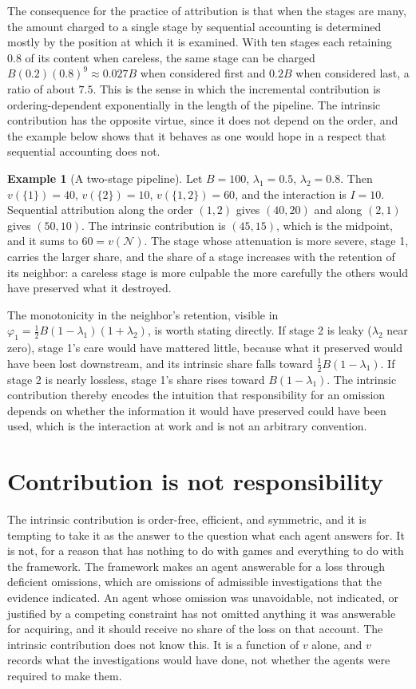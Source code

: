 \documentclass[11pt]{article}
\newcommand{\N}{\mathcal N}
\theoremstyle{plain}
\theoremstyle{definition}
\newtheorem{example}{Example}
\begin{document}
The consequence for the practice of attribution is that when the stages are many, the amount charged to a single stage by sequential accounting is determined mostly by the position at which it is examined. With ten stages each retaining $0.8$ of its content when careless, the same stage can be charged $B(0.2)(0.8)^9\approx0.027B$ when considered first and $0.2B$ when considered last, a ratio of about $7.5$. This is the sense in which the incremental contribution is ordering-dependent exponentially in the length of the pipeline. The intrinsic contribution has the opposite virtue, since it does not depend on the order, and the example below shows that it behaves as one would hope in a respect that sequential accounting does not.

\begin{example}[A two-stage pipeline]\label{ex:two}
Let $B=100$, $\lambda_1=0.5$, $\lambda_2=0.8$. Then $v(\{1\})=40$, $v(\{2\})=10$, $v(\{1,2\})=60$, and the interaction is $I=10$. Sequential attribution along the order $(1,2)$ gives $(40,20)$ and along $(2,1)$ gives $(50,10)$. The intrinsic contribution is $(45,15)$, which is the midpoint, and it sums to $60=v(\N)$. The stage whose attenuation is more severe, stage 1, carries the larger share, and the share of a stage increases with the retention of its neighbor: a careless stage is more culpable the more carefully the others would have preserved what it destroyed.
\end{example}

The monotonicity in the neighbor's retention, visible in $\varphi_1=\tfrac12B(1-\lambda_1)(1+\lambda_2)$, is worth stating directly. If stage 2 is leaky ($\lambda_2$ near zero), stage 1's care would have mattered little, because what it preserved would have been lost downstream, and its intrinsic share falls toward $\tfrac12B(1-\lambda_1)$. If stage 2 is nearly lossless, stage 1's share rises toward $B(1-\lambda_1)$. The intrinsic contribution thereby encodes the intuition that responsibility for an omission depends on whether the information it would have preserved could have been used, which is the interaction at work and is not an arbitrary convention.

\section{Contribution is not responsibility}\label{sec:restricted}

The intrinsic contribution is order-free, efficient, and symmetric, and it is tempting to take it as the answer to the question what each agent answers for. It is not, for a reason that has nothing to do with games and everything to do with the framework. The framework makes an agent answerable for a loss through deficient omissions, which are omissions of admissible investigations that the evidence indicated. An agent whose omission was unavoidable, not indicated, or justified by a competing constraint has not omitted anything it was answerable for acquiring, and it should receive no share of the loss on that account. The intrinsic contribution does not know this. It is a function of $v$ alone, and $v$ records what the investigations would have done, not whether the agents were required to make them.
\end{document}
